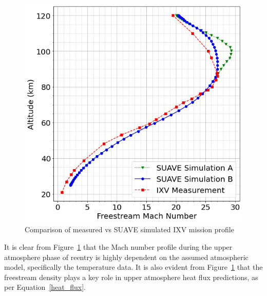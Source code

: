 \documentclass[%
 aip,
 amsmath,amssymb,
preprint,%
]{revtex4-1}
\begin{document}
\begin{figure}[h!]
\centering
\includegraphics[width=0.5\linewidth]{IXV_mission_profile_1976.png}
\caption{Comparison of measured vs SUAVE simulated IXV mission profile}
\label{valid1}
\end{figure}

It is clear from Figure~\ref{valid1} that the Mach number profile during the upper atmosphere phase of reentry is highly dependent on the assumed atmospheric model, specifically the temperature data. It is also evident from Figure~\ref{valid1} that the freestream density plays a key role in upper atmosphere heat flux predictions, as per Equation~\eqref{heat_flux}.
\end{document}
